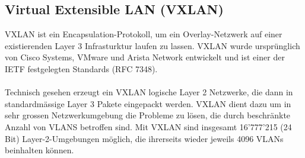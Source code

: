 \subsection{Virtual Extensible LAN (VXLAN)}
VXLAN ist ein Encapsulation-Protokoll, um ein Overlay-Netzwerk auf einer existierenden Layer 3 Infrasturktur laufen zu lassen. VXLAN wurde ursprünglich von Cisco Systems, VMware und Arista Network entwickelt und ist einer der IETF festgelegten Standards (RFC 7348). \\
\\
Technisch gesehen erzeugt ein VXLAN logische Layer 2 Netzwerke, die dann in standardmässige Layer 3 Pakete eingepackt werden. VXLAN dient dazu um in sehr grossen Netzwerkumgebung die Probleme zu lösen, die durch beschränkte Anzahl von VLANS betroffen sind. Mit VXLAN sind insgesamt 16’777’215 (24 Bit) Layer-2-Umgebungen möglich, die ihrerseits wieder jeweils 4096 VLANs beinhalten können.
